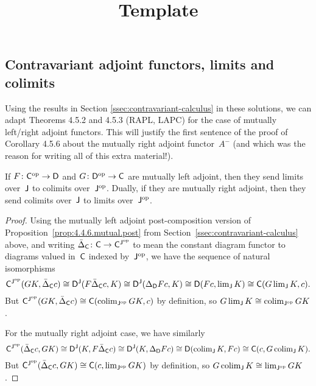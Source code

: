 \documentclass[../../solutions]{subfiles}
\title{Template}
\author{}
\begin{document}
\maketitle

\subsection{Contravariant adjoint functors, limits and colimits}
\label{ssec:contravariant-adjoints-limits}

Using the results in Section \ref{ssec:contravariant-calculus} in
these solutions, we can adapt Theorems 4.5.2 and 4.5.3 (RAPL, LAPC)
for the case of mutually left/right adjoint functors.  This will
justify the first sentence of the proof of Corollary 4.5.6 about the
mutually right adjoint functor~$A^-$ (and which was the reason for
writing all of this extra material!).

\begingroup
\renewcommand{\theHtheorem}{\theHsection.\arabic{theorem}.mutual}
\begin{proposition}
  If ${F}\colon{{\mathsf{C}}^{\mathrm{op}}}\to{{\mathsf{D}}}$ and ${G}\colon{{\mathsf{D}}^{\mathrm{op}}}\to{{\mathsf{C}}}$ are
  mutually left adjoint, then they send limits over~${\mathsf{J}}$ to colimits
  over~${\mathsf{J}}^{\mathrm{op}}$.  Dually, if they are mutually right adjoint, then
  they send colimits over~${\mathsf{J}}$ to limits over~${\mathsf{J}}^{\mathrm{op}}$.
\end{proposition}
\popthm
\endgroup

\begin{proof}[Proof]
  Using the mutually left adjoint post-composition version of
  Proposition~\ref{prop:4.4.6.mutual.post} from
  Section~\ref{ssec:contravariant-calculus} above, and writing
  ${\bar\Delta_{\mathsf{C}}}\colon{{\mathsf{C}}}\to{{\mathsf{C}}^{{\mathsf{J}}^{\mathrm{op}}}}$ to mean the constant
  diagram functor to diagrams valued in~${\mathsf{C}}$ indexed by~${\mathsf{J}}^{\mathrm{op}}$, we
  have the sequence of natural isomorphisms
  $${\mathsf{C}}^{{\mathsf{J}}^{\mathrm{op}}}(GK,\bar\Delta_{\mathsf{C}} c) \cong
  {\mathsf{D}}^{\mathsf{J}}(F\bar\Delta_{\mathsf{C}} c, K) \cong {\mathsf{D}}^{\mathsf{J}}(\Delta_{\mathsf{D}} Fc, K) \cong
  {\mathsf{D}}(Fc, \lim\nolimits_{\mathsf{J}} K) \cong {\mathsf{C}}(G \lim\nolimits_{\mathsf{J}} K, c).$$
  But
  ${\mathsf{C}}^{{\mathsf{J}}^{\mathrm{op}}}(GK,\bar\Delta_{\mathsf{C}} c)\cong {\mathsf{C}}(\operatorname{colim}_{{\mathsf{J}}^{\mathrm{op}}} GK,
  c)$ by definition, so $G\lim_{\mathsf{J}} K\cong \operatorname{colim}_{{\mathsf{J}}^{\mathrm{op}}} GK$.

  For the mutually right adjoint case, we have similarly
  $${\mathsf{C}}^{{\mathsf{J}}^{\mathrm{op}}}(\bar\Delta_{\mathsf{C}} c,GK) \cong
  {\mathsf{D}}^{\mathsf{J}}(K, F\bar\Delta_{\mathsf{C}} c) \cong {\mathsf{D}}^{\mathsf{J}}(K, \Delta_{\mathsf{D}} Fc) \cong
  {\mathsf{D}}(\operatorname{colim}\nolimits_{\mathsf{J}} K, Fc) \cong
  {\mathsf{C}}(c, G \operatorname{colim}\nolimits_{\mathsf{J}} K).$$
  But
  ${\mathsf{C}}^{{\mathsf{J}}^{\mathrm{op}}}(\bar\Delta_{\mathsf{C}} c, GK)\cong {\mathsf{C}}(c, \lim_{{\mathsf{J}}^{\mathrm{op}}} GK)$
  by definition, so $G\operatorname{colim}_{\mathsf{J}} K\cong \lim_{{\mathsf{J}}^{\mathrm{op}}} GK$.
\end{proof}
\end{document}
